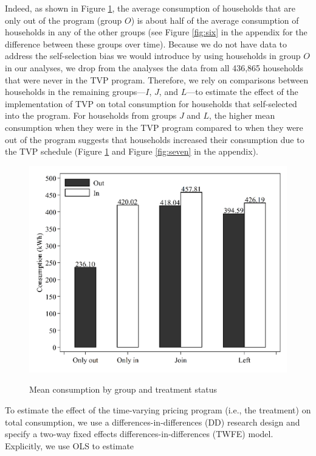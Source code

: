 \documentclass[12pt]{article}
\begin{document}
Indeed, as shown in Figure \ref{fig:one}, the average consumption of households that are only out of the program (group $O$) is about half of the average consumption of households in any of the other groups (see Figure \ref{fig:six} in the appendix for the difference between these groups over time). Because we do not have data to address the self-selection bias we would introduce by using households in group $O$ in our analyses, we drop from the analyses the data from all 436,865 households that were never in the TVP program. Therefore, we rely on comparisons between households in the remaining groups---$I$, $J$, and  $L$---to estimate the effect of the implementation of TVP on total consumption for households that self-selected into the program. For households from groups $J$ and $L$, the higher mean consumption when they were in the TVP program compared to when they were out of the program suggests that households increased their consumption due to the TVP schedule (Figure \ref{fig:one} and Figure \ref{fig:seven} in the appendix).

\begin{figure}[ht]
  \caption{Mean consumption by group and treatment status}\label{fig:one}
  \begin{center}
  {\includegraphics[width=1\textwidth]{./figures/image1.png}}
  \end{center}
\end{figure}

To estimate the effect of the time-varying pricing program (i.e., the treatment) on total consumption, we use a differences-in-differences (DD) research design and specify a two-way fixed effects differences-in-differences (TWFE) model. Explicitly, we use OLS to estimate
\end{document}
